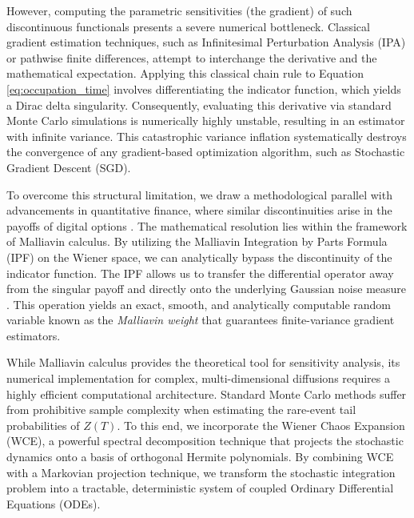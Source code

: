 \documentclass[11pt]{article}
\begin{document}
However, computing the parametric sensitivities (the gradient) of such discontinuous functionals presents a severe numerical bottleneck. Classical gradient estimation techniques, such as Infinitesimal Perturbation Analysis (IPA) or pathwise finite differences, attempt to interchange the derivative and the mathematical expectation. Applying this classical chain rule to Equation \eqref{eq:occupation_time} involves differentiating the indicator function, which yields a Dirac delta singularity. Consequently, evaluating this derivative via standard Monte Carlo simulations is numerically highly unstable, resulting in an estimator with infinite variance. This catastrophic variance inflation systematically destroys the convergence of any gradient-based optimization algorithm, such as Stochastic Gradient Descent (SGD).

To overcome this structural limitation, we draw a methodological parallel with advancements in quantitative finance, where similar discontinuities arise in the payoffs of digital options \cite{fournie1999applications}. The mathematical resolution lies within the framework of Malliavin calculus. By utilizing the Malliavin Integration by Parts Formula (IPF) on the Wiener space, we can analytically bypass the discontinuity of the indicator function. The IPF allows us to transfer the differential operator away from the singular payoff and directly onto the underlying Gaussian noise measure \cite{nualart2006malliavin}. This operation yields an exact, smooth, and analytically computable random variable known as the \textit{Malliavin weight} that guarantees finite-variance gradient estimators.

While Malliavin calculus provides the theoretical tool for sensitivity analysis, its numerical implementation for complex, multi-dimensional diffusions requires a highly efficient computational architecture. Standard Monte Carlo methods suffer from prohibitive sample complexity when estimating the rare-event tail probabilities of $Z(T)$. To this end, we incorporate the Wiener Chaos Expansion (WCE), a powerful spectral decomposition technique that projects the stochastic dynamics onto a basis of orthogonal Hermite polynomials. By combining WCE with a Markovian projection technique, we transform the stochastic integration problem into a tractable, deterministic system of coupled Ordinary Differential Equations (ODEs).
\end{document}
